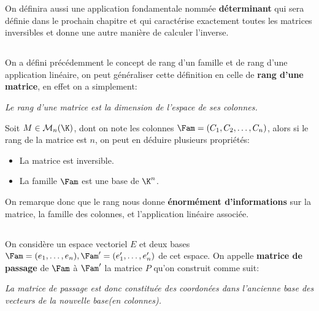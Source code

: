 On définira aussi une application fondamentale nommée \textbf{déterminant} qui sera définie dans le prochain chapitre et qui caractérise exactement toutes les matrices inversibles et donne une autre manière de calculer l'inverse.
\pagebreak

\subsection*{}

On a défini précédemment le concept de rang d'un famille et de rang d'une application linéaire, on peut généraliser cette définition en celle de \textbf{rang d'une matrice}, en effet on a simplement:
\begin{center}
   \textit{Le rang d'une matrice est la dimension de l'espace de ses colonnes.}
\end{center}

Soit \(M \in \mathcal{M}_n(\K)\), dont on note les colonnes \(\Fam = (C_1, C_2, \ldots, C_n)\), alors si le rang de la matrice est \(n\), on peut en déduire plusieurs propriétés:
\begin{multicols}{2}
   \begin{itemize}
      \item La matrice est inversible.
      \item La famille \(\Fam\) est une base de \(\K^n\).
   \end{itemize}
\end{multicols}
On remarque donc que le rang nous donne \textbf{énormément d'informations} sur la matrice, la famille des colonnes, et l'application linéaire associée.

\subsection*{}

On considère un espace vectoriel \(E\) et deux bases \(\Fam=(e_1, \ldots, e_n), \Fam'=({e}_1', \ldots, {e}_n')\) de cet espace.\+
On appelle \textbf{matrice de passage} de \(\Fam\) à \(\Fam'\) la matrice \(P\) qu'on construit comme suit:
\begin{center}
   \textit{
      La matrice de passage est donc constituée des coordonées dans l'ancienne base des vecteurs de la nouvelle base(en colonnes).
   }
\end{center}

